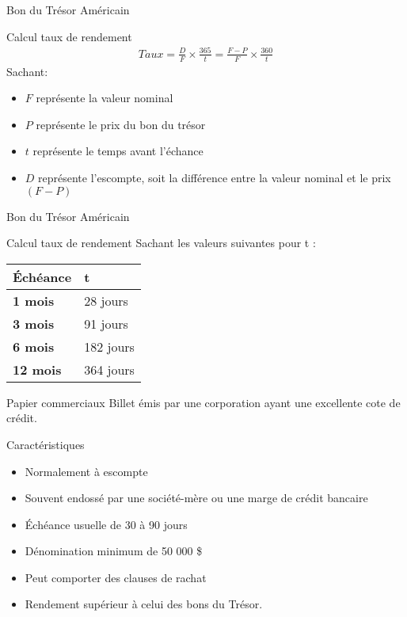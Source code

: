 \documentclass{beamer}
\begin{document}
\begin{frame}{Bon du Trésor Américain}
\begin{block}{Calcul taux de rendement}
\begin{align*}
Taux = \frac{D}{F} \times \frac{365}{t}=\frac{F-P}{F} \times \frac{360}{t}
\end{align*}
Sachant:
\begin{itemize}
\item $F$ représente la valeur nominal 
\item $P$ représente le prix du bon du trésor 
\item $t$ représente le temps avant l'échance 
\item $D$ représente l'escompte, soit la différence entre la valeur nominal et le prix $(F-P)$
\end{itemize}
\end{block}
\end{frame}

\begin{frame}{Bon du Trésor Américain}
\begin{block}{Calcul taux de rendement}
Sachant les valeurs suivantes pour t :
\begin{table}[H]
\centering
\begin{tabular}{@{}ll@{}}
\toprule
\textbf{Échéance} & \textbf{t} \\ \midrule
\textbf{1 mois}   & 28 jours   \\
\textbf{3 mois}   & 91 jours   \\
\textbf{6 mois}   & 182 jours  \\
\textbf{12 mois}  & 364 jours  \\ \bottomrule
\end{tabular}
\end{table}
\end{block}
\end{frame}

\begin{frame}{Papier commerciaux}
Billet émis par une corporation ayant une excellente cote de crédit.
\begin{block}{Caractéristiques}
\begin{itemize}
\item Normalement à escompte
\item Souvent endossé par une société-mère ou une marge de crédit bancaire
\item Échéance usuelle de 30 à 90 jours
\item Dénomination minimum de 50 000 \$
\item Peut comporter des clauses de rachat
\item Rendement supérieur à celui des bons du Trésor.
\end{itemize}
\end{block}
\end{frame}
\end{document}
